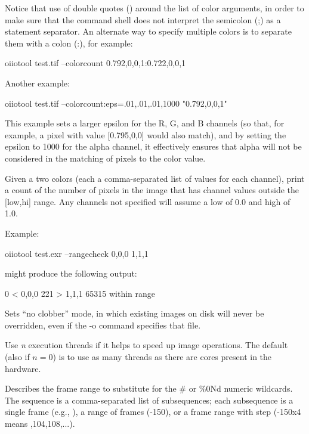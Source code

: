 \noindent Notice that use of double quotes (\qkw{ }) around the list of
color arguments, in order to make sure that the command shell does not
interpret the semicolon ({\cf ;}) as a statement separator.  An
alternate way to specify multiple colors is to separate them with a
colon ({\cf :}), for example:
\begin{code}
    oiiotool test.tif --colorcount 0.792,0,0,1:0.722,0,0,1
\end{code}

\noindent Another example:

\begin{code}
    oiiotool test.tif --colorcount:eps=.01,.01,.01,1000 "0.792,0,0,1"
\end{code}

\noindent This example sets a larger epsilon for the R, G, and B 
channels (so that, for example, a pixel with value [0.795,0,0] would
also match), and by setting the epsilon to 1000 for the alpha channel,
it effectively ensures that alpha will not be considered in the matching
of pixels to the color value.
\apiend

Given a two colors (each a comma-separated list of values for each
channel), print a count of the number of pixels in the image that has
channel values outside the [low,hi] range.  Any channels not
specified will assume a low of 0.0 and high of 1.0.

\noindent Example:

\begin{code}
    oiiotool test.exr --rangecheck 0,0,0 1,1,1
\end{code}
\noindent might produce the following output:
\begin{code}
     0  < 0,0,0
   221  > 1,1,1
 65315  within range
\end{code}
\apiend

Sets ``no clobber'' mode, in which existing images on disk will never be 
overridden, even if the {\cf -o} command specifies that file.
\apiend

Use \emph{n} execution threads if it helps to speed up image operations.
The default (also if $n=0$) is to use as many threads as there are cores
present in the hardware.
\apiend

Describes the frame range to substitute for the {\cf \#} or {\cf \%0Nd} 
numeric wildcards.  The
sequence is a comma-separated list of subsequences; each subsequence
is a single frame (e.g., {}), a range of frames ({-150}),
or a frame range with step ({-150x4} means {,104,108,...}).

